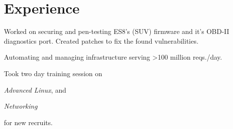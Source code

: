 \documentclass[]{deedy}
\begin{document}
\begin{minipage}[t]{0.65\textwidth}


\section{Experience}
\begin{tightemize}
\item Worked on securing and pen-testing ES8's (SUV) firmware and it's OBD-II diagnostics port. Created patches to fix the found vulnerabilities.
\end{tightemize}
\sectionsep

\sectionsep

\begin{tightemize}
\item Automating and managing infrastructure serving >100 million reqs./day.
\item Took two day training session on 
\begin{enumerate*}[label=(\roman*)]
  \item \textit{Advanced Linux}, and
  \item \textit{Networking}
\end{enumerate*}
 for new recruits.
\end{tightemize}
\sectionsep


\end{minipage}
\end{document}
